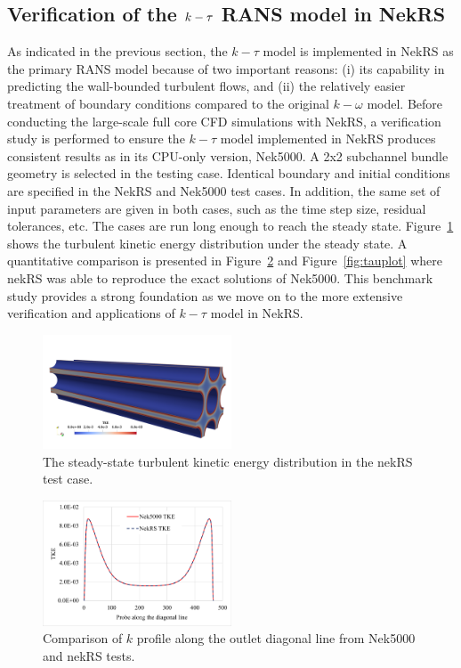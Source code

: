 \subsection{Verification of the $\lowercase{k}-\tau$ RANS model in NekRS}
\label{sec:nrs1}
As indicated in the previous section, the $k-\tau$ model is implemented in NekRS as the primary RANS model because of two important reasons: (i) its capability in predicting the wall-bounded turbulent flows, and (ii) the relatively easier treatment of boundary conditions compared to the original $k-\omega$ model. Before conducting the large-scale full core CFD simulations with NekRS, a verification study is performed to ensure the $k-\tau$ model implemented in NekRS produces consistent results as in its CPU-only version, Nek5000. A 2x2 subchannel bundle geometry is selected in the testing case. Identical boundary and initial conditions are specified in the NekRS and Nek5000 test cases. In addition, the same set of input parameters are given in both cases, such as the time step size, residual tolerances, etc. The cases are run long enough to reach the steady state. Figure~\ref{fig:tkeofbundle} shows the turbulent kinetic energy distribution under the steady state. A quantitative comparison is presented in Figure~\ref{fig:tkeplot} and Figure~\ref{fig:tauplot} where nekRS was able to reproduce the exact solutions of Nek5000. This benchmark study provides a strong foundation as we move on to the more extensive verification and applications of $k-\tau$ model in NekRS.

\begin{figure}[!ht]
\centering
\includegraphics[width=0.5\textwidth]{./figures/TKE_in_bundle.png}
\caption{The steady-state turbulent kinetic energy distribution in the nekRS test case. }
\label{fig:tkeofbundle}
\end{figure}

\begin{figure}[!ht]
\centering
\includegraphics[width=0.5\textwidth]{./figures/tke_verification_bundle2x2.png}
\caption{Comparison of $k$ profile along the outlet diagonal line from Nek5000 and nekRS tests. }
\label{fig:tkeplot}
\end{figure}

